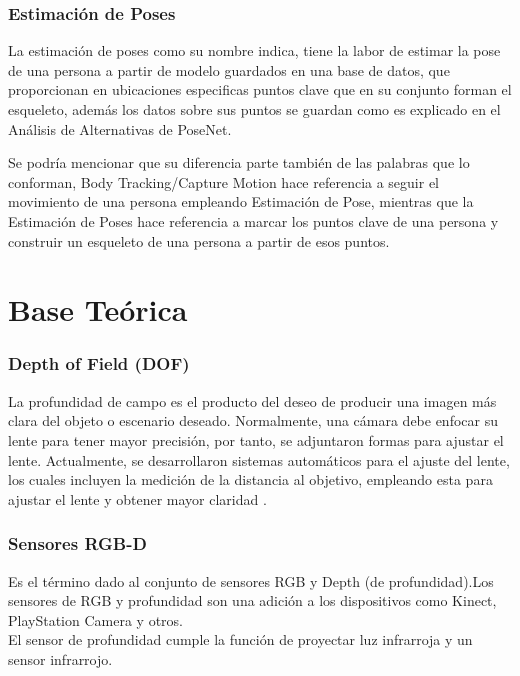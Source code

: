 \subsubsection{Estimación de Poses}

La estimación de poses como su nombre indica, tiene la labor de estimar la pose de una persona a partir de modelo guardados en una base de datos, que proporcionan en ubicaciones especificas puntos clave que en su conjunto forman el esqueleto, además los datos sobre sus puntos se guardan como es explicado en el Análisis de Alternativas de PoseNet.

Se podría mencionar que su diferencia parte también de las palabras que lo conforman, Body Tracking/Capture Motion hace referencia a seguir el movimiento de una persona empleando Estimación de Pose, mientras que la Estimación de Poses hace referencia a marcar los puntos clave de una persona y construir un esqueleto de una persona a partir de esos puntos\cite{oved2018real}.


\section{Base Teórica}






\subsubsection{Depth of Field (DOF)}

La profundidad de campo es el producto del deseo de producir una imagen más clara del objeto o escenario deseado. Normalmente, una cámara debe enfocar su lente para tener mayor precisión, por tanto, se adjuntaron formas para ajustar el lente. Actualmente, se desarrollaron sistemas automáticos para el ajuste del lente, los cuales incluyen la medición de la distancia al objetivo, empleando esta para ajustar el lente y obtener mayor claridad \cite{madsen2000depth}. 

\subsubsection{Sensores RGB-D} 

Es el término dado al conjunto de sensores RGB y Depth (de profundidad).Los sensores de RGB y profundidad son una adición a los dispositivos como Kinect, PlayStation Camera y otros. 
\\El sensor de profundidad cumple la función de proyectar luz infrarroja y un sensor infrarrojo. 

